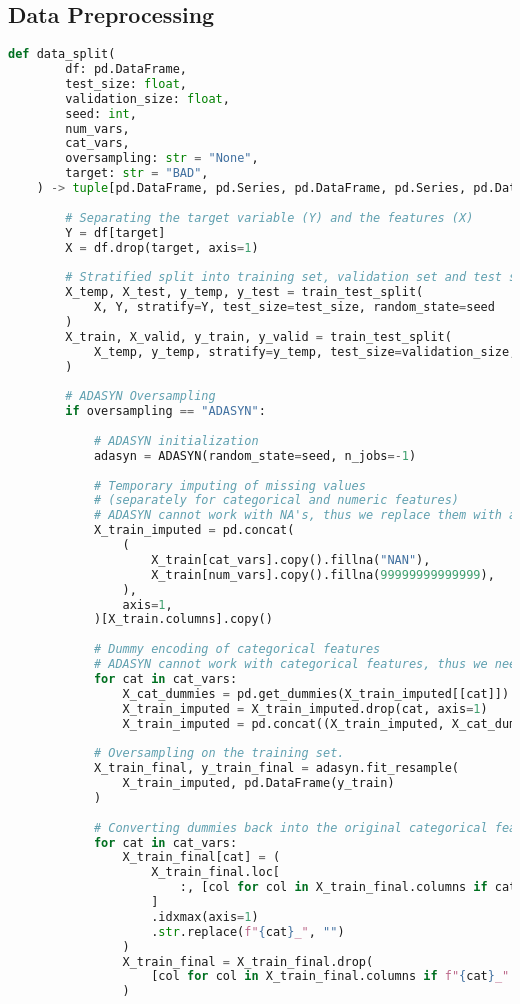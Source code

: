 \subsection{Data Preprocessing}
\begin{lstlisting}[language=Python, basicstyle=\footnotesize\ttfamily]
	def data_split(
		df: pd.DataFrame,
		test_size: float,
		validation_size: float,
		seed: int,
		num_vars,
		cat_vars,
		oversampling: str = "None",
		target: str = "BAD",
	) -> tuple[pd.DataFrame, pd.Series, pd.DataFrame, pd.Series, pd.DataFrame, pd.Series]:
	
		# Separating the target variable (Y) and the features (X)
		Y = df[target]
		X = df.drop(target, axis=1)
	
		# Stratified split into training set, validation set and test set
		X_temp, X_test, y_temp, y_test = train_test_split(
			X, Y, stratify=Y, test_size=test_size, random_state=seed
		)
		X_train, X_valid, y_train, y_valid = train_test_split(
			X_temp, y_temp, stratify=y_temp, test_size=validation_size, random_state=seed
		)
	
		# ADASYN Oversampling
		if oversampling == "ADASYN":
	
			# ADASYN initialization
			adasyn = ADASYN(random_state=seed, n_jobs=-1)
	
			# Temporary imputing of missing values
			# (separately for categorical and numeric features)
			# ADASYN cannot work with NA's, thus we replace them with arbitrary values.
			X_train_imputed = pd.concat(
				(
					X_train[cat_vars].copy().fillna("NAN"),
					X_train[num_vars].copy().fillna(99999999999999),
				),
				axis=1,
			)[X_train.columns].copy()
	
			# Dummy encoding of categorical features
			# ADASYN cannot work with categorical features, thus we need to encode them.
			for cat in cat_vars:
				X_cat_dummies = pd.get_dummies(X_train_imputed[[cat]])
				X_train_imputed = X_train_imputed.drop(cat, axis=1)
				X_train_imputed = pd.concat((X_train_imputed, X_cat_dummies), axis=1)
	
			# Oversampling on the training set.
			X_train_final, y_train_final = adasyn.fit_resample(
				X_train_imputed, pd.DataFrame(y_train)
			)
	
			# Converting dummies back into the original categorical features.
			for cat in cat_vars:
				X_train_final[cat] = (
					X_train_final.loc[
						:, [col for col in X_train_final.columns if cat in col]
					]
					.idxmax(axis=1)
					.str.replace(f"{cat}_", "")
				)
				X_train_final = X_train_final.drop(
					[col for col in X_train_final.columns if f"{cat}_" in col], axis=1
				)
	

\end{lstlisting}
